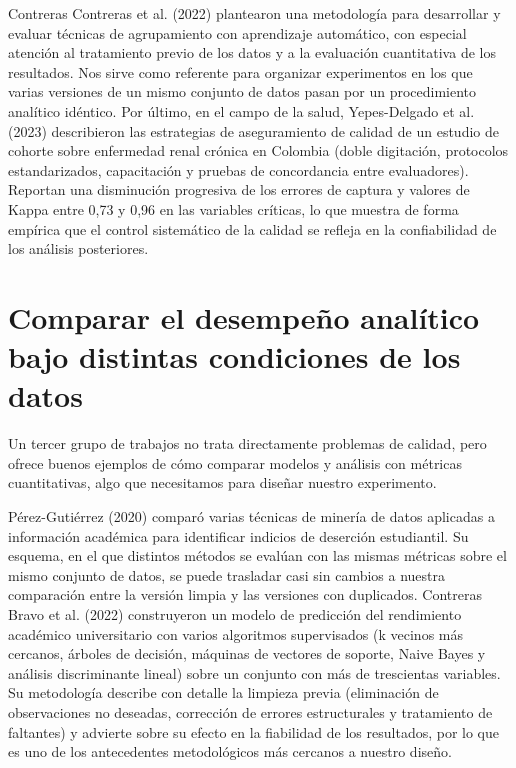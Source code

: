 \documentclass[11pt,openany,oneside,letterpaper]{book}
\newcommand{\seccioncorta}[2]{{\renewcommand{\sectionmark}[1]{}\section{#2}}\markright{\MakeUppercase{\thesection.\ #1}}}
\begin{document}
Contreras Contreras et al. (2022) plantearon una metodología para desarrollar y evaluar técnicas de agrupamiento con aprendizaje automático, con especial atención al tratamiento previo de los datos y a la evaluación cuantitativa de los resultados. Nos sirve como referente para organizar experimentos en los que varias versiones de un mismo conjunto de datos pasan por un procedimiento analítico idéntico. Por último, en el campo de la salud, Yepes-Delgado et al. (2023) describieron las estrategias de aseguramiento de calidad de un estudio de cohorte sobre enfermedad renal crónica en Colombia (doble digitación, protocolos estandarizados, capacitación y pruebas de concordancia entre evaluadores). Reportan una disminución progresiva de los errores de captura y valores de Kappa entre 0,73 y 0,96 en las variables críticas, lo que muestra de forma empírica que el control sistemático de la calidad se refleja en la confiabilidad de los análisis posteriores.

\seccioncorta{Desempeño analítico y condiciones de los datos}{Comparar el desempeño analítico bajo distintas condiciones de los datos}

Un tercer grupo de trabajos no trata directamente problemas de calidad, pero ofrece buenos ejemplos de cómo comparar modelos y análisis con métricas cuantitativas, algo que necesitamos para diseñar nuestro experimento.

Pérez-Gutiérrez (2020) comparó varias técnicas de minería de datos aplicadas a información académica para identificar indicios de deserción estudiantil. Su esquema, en el que distintos métodos se evalúan con las mismas métricas sobre el mismo conjunto de datos, se puede trasladar casi sin cambios a nuestra comparación entre la versión limpia y las versiones con duplicados. Contreras Bravo et al. (2022) construyeron un modelo de predicción del rendimiento académico universitario con varios algoritmos supervisados (k vecinos más cercanos, árboles de decisión, máquinas de vectores de soporte, Naive Bayes y análisis discriminante lineal) sobre un conjunto con más de trescientas variables. Su metodología describe con detalle la limpieza previa (eliminación de observaciones no deseadas, corrección de errores estructurales y tratamiento de faltantes) y advierte sobre su efecto en la fiabilidad de los resultados, por lo que es uno de los antecedentes metodológicos más cercanos a nuestro diseño.
\end{document}

